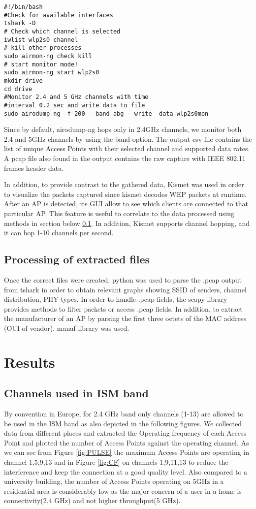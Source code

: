 \documentclass[conference]{IEEEtran}
\begin{document}
\begin{lstlisting}
#!/bin/bash
#Check for available interfaces
tshark -D  
# Check which channel is selected
iwlist wlp2s0 channel   
# kill other processes 
sudo airmon-ng check kill 
# start monitor mode!
sudo airmon-ng start wlp2s0   
mkdir drive
cd drive
#Monitor 2.4 and 5 GHz channels with time
#interval 0.2 sec and write data to file
sudo airodump-ng -f 200 --band abg --write  data wlp2s0mon 
\end{lstlisting}
Since by default, airodump-ng hops only in 2.4GHz channels,
we monitor both 2.4 and 5GHz channels by using the band option. The output csv file contains the list of unique Access Points with their selected channel and supported data rates. A pcap file also found in the output contains the raw capture with IEEE 802.11 frames header data. 

In addition, to provide contrast to the gathered data, Kismet \cite{c2} was used in order to visualize the packets captured since kismet decodes WEP packets at runtime. After an AP is detected, its GUI allow to see which clients are connected to that particular AP. This feature is useful to correlate to the data processed using methods in section below \ref{ssec: processing}. In addition, Kismet supports channel hopping, and it can hop 1-10 channels per second.

\subsection{Processing of extracted files} \label{ssec: processing}

Once the correct files were created, python was used to parse the .pcap output from tshark in order to obtain relevant graphs showing SSID of senders, channel distribution, PHY types. In order to handle .pcap fields, the scapy library \cite{c3} provides methods to filter packets or access .pcap fields. In addition, to extract the manufacturer of an AP by parsing the first three octets of the MAC address (OUI of vendor), manuf library \cite{c4} was used. 

\section{Results}
\subsection{Channels used in ISM band}
By convention in Europe, for 2.4 GHz band only channels (1-13) are allowed to be used in the ISM band as also depicted in the following figures. We collected data from different places and extracted the Operating frequency of each Access Point and plotted the number of Access Points against the operating channel. As we can see from  Figure \ref{fig:PULSE} the maximum Access Points are operating in channel 1,5,9,13 and in Figure \ref{fig:CF} on channels 1,9,11,13 to reduce the interference and keep the connection at a good quality level. Also compared to a university building, the number of Access Points operating on 5GHz in a residential area is considerably low as the major concern of a user in a home is connectivity(2.4 GHz) and not higher throughput(5 GHz).    
\end{document}
